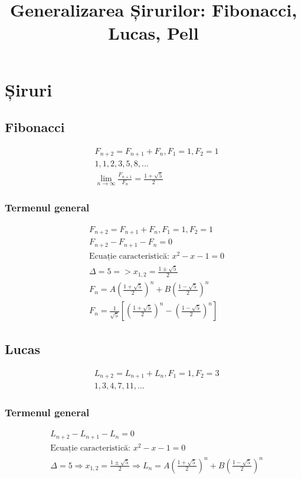 \documentclass[12pt]{article}
\title{Generalizarea Șirurilor: Fibonacci, Lucas, Pell}
\author{\enspace}
\affil{\enspace}
\date{\enspace}
\theoremstyle{definition}
\begin{document}
	\section*{Șiruri}
		\subsection*{Fibonacci}
		\[\begin{aligned}
			& F_{n+2} = F_{n+1}+F_{n}, F_1=1, F_2=1 \\
			& 1,1,2,3,5,8,... \\
			& \lim\limits_{n\to \infty} \frac{F_{n+1}}{F_n}= \frac{1+\sqrt{5}}{2}
		\end{aligned}\]
		\subsubsection*{Termenul general}
		\[\begin{aligned}			
			& F_{n+2} = F_{n+1} + F_{n}, F_1 = 1, F_2 = 1\\
			& F_{n+2} - F_{n+1} - F_{n} = 0\\
			& \text{Ecuație caracteristică: } x^2 -x -1 = 0\\
			&\Delta = 5 => x_{1,2} = \frac{1 \pm \sqrt{5}}{2}\\
			&F_n = A\left(\frac{1+\sqrt{5}}{2}\right)^n
    				+ B\left(\frac{1-\sqrt{5}}{2}\right)^n\\
    			& F_n=\frac{1}{\sqrt{5}} \left[ \left(\frac{1+\sqrt{5}}{2}\right)^n-\left(\frac{1-\sqrt{5}}{2}\right)^n \right]
		\end{aligned}\]
		\subsection*{Lucas}
		\[\begin{aligned}
			&L_{n+2}=L_{n+1}+L_n, F_1=1, F_2=3\\
			&1,3,4,7,11,...
		\end{aligned}\]
		\subsubsection*{Termenul general}
		\[\begin{aligned}
			&L_{n+2}-L_{n+1}-L_n = 0\\
			&\text{Ecuație caracteristică: }x^2-x-1=0 \\
		&\Delta = 5 \Rightarrow x_{1,2} = \frac{1 \pm \sqrt{5}}{2}
		\Rightarrow L_n = A\left(\frac{1+\sqrt{5}}{2}\right)^n
						+ B\left(\frac{1-\sqrt{5}}{2}\right)^n
		\end{aligned}\]
\end{document}
